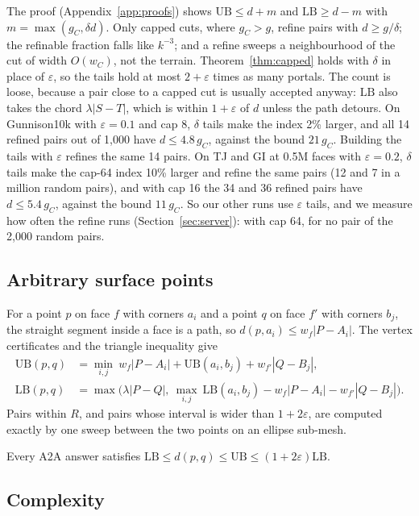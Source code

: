 \documentclass[sigconf,nonacm,screen]{acmart}
\newcommand{\LB}{\mathrm{LB}}
\newcommand{\UB}{\mathrm{UB}}
\newcommand{\eps}{\varepsilon}
\begin{document}
The proof (Appendix~\ref{app:proofs}) shows $\UB\le d+m$ and $\LB\ge d-m$ with $m=\max(g_C,\delta d)$. Only capped
cuts, where $g_C>g$, refine pairs with $d\ge g/\delta$; the refinable fraction falls like $k^{-3}$; and a refine
sweeps a neighbourhood of the cut of width $O(w_C)$, not the terrain. Theorem~\ref{thm:capped} holds with $\delta$
in place of $\eps$, so the tails hold at most $2+\eps$ times as many portals. The count is loose, because a pair close to a capped cut is
usually accepted anyway: $\LB$ also takes the chord $\lambda|S-T|$, which is within $1+\eps$ of $d$ unless the path
detours. On Gunnison10k with $\eps=0.1$ and cap 8, $\delta$ tails make the index 2\% larger, and all 14 refined
pairs out of 1,000 have $d\le4.8\,g_C$, against the bound $21\,g_C$. Building the tails with $\eps$ refines the same
14 pairs. On TJ and GI at 0.5M faces with $\eps=0.2$, $\delta$ tails make the cap-64 index 10\% larger and refine
the same pairs (12 and 7 in a million random pairs), and with cap 16 the 34 and 36 refined pairs have
$d\le5.4\,g_C$, against the bound $11\,g_C$. So our other runs use $\eps$ tails, and we measure how often the refine
runs (Section~\ref{sec:server}): with cap 64, for no pair of the 2,000 random pairs.

\subsection{Arbitrary surface points}
\label{sec:a2a}

For a point $p$ on face $f$ with corners $a_i$ and a point $q$ on face $f'$ with corners $b_j$, the straight
segment inside a face is a path, so $d(p,a_i)\le w_f|P-A_i|$. The vertex certificates and the triangle
inequality give
\begin{align*}
\UB(p,q) &= \min_{i,j}\ w_f|P-A_i|+\UB(a_i,b_j)+w_{f'}|Q-B_j|,\\
\LB(p,q) &= \max\Big(\lambda|P-Q|,\ \max_{i,j}\ \LB(a_i,b_j)-w_f|P-A_i|-w_{f'}|Q-B_j|\Big).
\end{align*}
Pairs within $R$, and pairs whose interval is wider than $1+2\eps$, are computed exactly by one sweep between
the two points on an ellipse sub-mesh.
\begin{theorem}
\label{thm:a2a}
Every A2A answer satisfies $\LB\le d(p,q)\le\UB\le(1+2\eps)\LB$.
\end{theorem}

\subsection{Complexity}
\end{document}
